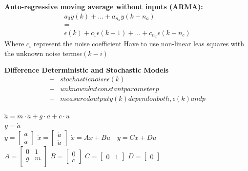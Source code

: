 \begin{tcolorbox}[colback=green!5!white,colframe=green!75!black,title=\textbf{Stochastic Model}]
	\textbf{Auto-regressive moving average without inputs (ARMA):}
	\begin{align*}
	a_0y(k) + ... + a_{n_a}y(k-n_a)\\
	=\\
	\epsilon(k) + c_1 \epsilon(k-1) + ... + c_{n_x} \epsilon(k-n_c)
	\end{align*}
	Where $c_i$ represent the noise coefficient
	Have to use non-linear leas squares with the unknown noise terms$ \epsilon(k-i)$
	
	\textbf{Difference Deterministic and Stochastic Models}
	\begin{align*}
	- &stochastic noise \epsilon(k)\\
	- &unknown but constant parameter p\\
	- &measured output y(k) depend on both, \epsilon(k) and p
	\end{align*}
\end{tcolorbox}

\begin{tcolorbox}[colback=green!5!white,colframe=green!75!black,title=\textbf{Example for State Space Model}]
	$\ddot{a} = m \cdot \dot{a} + g\cdot a + c \cdot u$\\
	$y = \dot{a}$\\
	$y = \begin{bmatrix}
		a \\ \dot{a}
	\end{bmatrix}$
	$
	\dot{x} = \begin{bmatrix}
	\dot{a} \\ \ddot{a}
	\end{bmatrix}
	$
	$ \dot x = Ax+Bu \quad y = Cx+Du $
	\\
	$
	A = \begin{bmatrix}
	0 & 1 \\
	g & m \\
	\end{bmatrix}
	$
	$ B= \begin{bmatrix}
	0 \\
	c
	\end{bmatrix}$
	$C = \begin{bmatrix}
	0 & 1
	\end{bmatrix} $
	$D = \begin{bmatrix}
	0
	\end{bmatrix}$
\end{tcolorbox}

